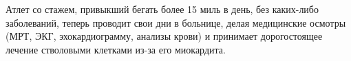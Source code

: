 Атлет со стажем, привыкший бегать более 15 миль в день, без каких-либо
заболеваний, теперь проводит свои дни в больнице, делая медицинские осмотры
(МРТ, ЭКГ, эхокардиограмму, анализы крови) и принимает дорогостоящее лечение
стволовыми клетками из-за его миокардита.

